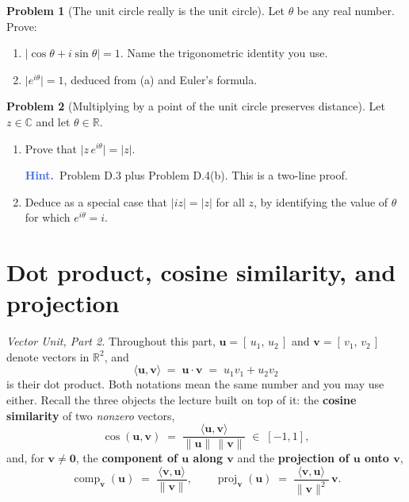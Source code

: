\documentclass[11pt]{article}
\theoremstyle{definition}
\newtheorem{prob}{Problem}[section]
\newcommand{\hint}[1]{\par\smallskip\noindent
  {\small\sffamily\textcolor{RoyalBlue}{\textbf{Hint.}}\ #1}\par\smallskip}
\newcommand{\R}{\mathbb{R}}
\newcommand{\C}{\mathbb{C}}
\newcommand{\vc}[1]{\mathbf{#1}}
\newcommand{\norm}[1]{\lVert #1\rVert}
\newcommand{\ip}[2]{\langle #1,#2\rangle}
\newcommand{\proj}[2]{\operatorname{proj}_{#1}(#2)}
\newcommand{\comp}[2]{\operatorname{comp}_{#1}(#2)}
\begin{document}
\begin{prob}[The unit circle really is the unit circle]
Let $\theta$ be any real number. Prove:
\begin{enumerate}[label=\textbf{(\alph*)},leftmargin=2.6em,itemsep=7pt,topsep=6pt]
  \item $\lvert\cos\theta + i\sin\theta\rvert = 1$. Name the trigonometric
        identity you use.
  \item $\lvert e^{i\theta}\rvert = 1$, deduced from (a) and Euler's formula.
\end{enumerate}
\end{prob}

\begin{prob}[Multiplying by a point of the unit circle preserves distance]
Let $z\in\C$ and let $\theta\in\R$.

\begin{enumerate}[label=\textbf{(\alph*)},leftmargin=2.6em,itemsep=7pt,topsep=6pt]
  \item Prove that $\lvert z\,e^{i\theta}\rvert = \lvert z\rvert$.
        \hint{Problem D.3 plus Problem D.4(b). This is a two-line proof.}
  \item Deduce as a special case that $\lvert iz\rvert = \lvert z\rvert$ for all
        $z$, by identifying the value of $\theta$ for which $e^{i\theta}=i$.
\end{enumerate}
\end{prob}

\section{Dot product, cosine similarity, and projection}
\emph{Vector Unit, Part 2.} Throughout this part, $\vc{u}=[\,u_1,\,u_2\,]$ and
$\vc{v}=[\,v_1,\,v_2\,]$ denote vectors in $\R^{2}$, and
\[
  \ip{\vc{u}}{\vc{v}} \;=\; \vc{u}\cdot\vc{v} \;=\; u_1v_1+u_2v_2
\]
is their dot product. Both notations mean the same number and you may use
either. Recall the three objects the lecture built on top of it: the
\textbf{cosine similarity} of two \emph{nonzero} vectors,
\[
  \cos(\vc{u},\vc{v}) \;=\; \frac{\ip{\vc{u}}{\vc{v}}}{\norm{\vc{u}}\,\norm{\vc{v}}}
  \;\in\;[-1,1] ,
\]
and, for $\vc{v}\neq\vc{0}$, the \textbf{component of $\vc{u}$ along $\vc{v}$}
and the \textbf{projection of $\vc{u}$ onto $\vc{v}$},
\[
  \comp{\vc{v}}{\vc{u}} \;=\; \frac{\ip{\vc{v}}{\vc{u}}}{\norm{\vc{v}}} ,
  \qquad
  \proj{\vc{v}}{\vc{u}} \;=\; \frac{\ip{\vc{v}}{\vc{u}}}{\norm{\vc{v}}^{2}}\,\vc{v} .
\]
\end{document}
